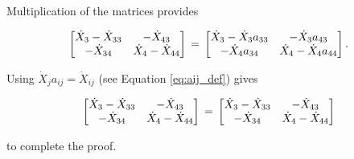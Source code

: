 \noindent Multiplication of the matrices provides

\begin{equation} \label{eq:Xdifference2Proof-3}
\begin{bmatrix} 	\dot{X}_{3} - \dot{X}_{33} & - \dot{X}_{43}	\\
				- \dot{X}_{34} & \dot{X}_{4} - \dot{X}_{44}	\\
\end{bmatrix} \\
= \\
\begin{bmatrix} 	\dot{X}_{3} - \dot{X}_3 a_{33} & - \dot{X}_3 a_{43}	\\
				- \dot{X}_4 a_{34} & \dot{X}_{4} - \dot{X}_4 a_{44}	\\
\end{bmatrix}.
\end{equation}

\noindent Using $\dot{X}_j a_{ij} = \dot{X}_{ij}$ (see Equation \ref{eq:aij_def}) gives

\begin{equation} \label{eq:Xdifference2Proof-4}
\begin{bmatrix} 	\dot{X}_{3} - \dot{X}_{33} & - \dot{X}_{43}	\\
				- \dot{X}_{34} & \dot{X}_{4} - \dot{X}_{44}	\\
\end{bmatrix} \\
= \\
\begin{bmatrix} 	\dot{X}_{3} - \dot{X}_{33} & - \dot{X}_{43}	\\
				- \dot{X}_{34} & \dot{X}_{4} - \dot{X}_{44}	\\
\end{bmatrix}
\end{equation}

\noindent to complete the proof.



